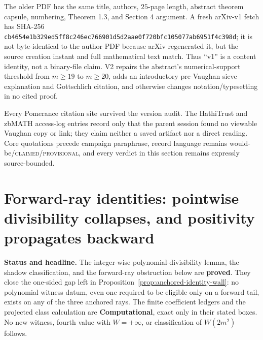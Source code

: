 \documentclass[10pt,reqno]{amsart}
\theoremstyle{definition}
\newcommand{\1}{\mathbf 1}
\begin{document}
The older PDF has the same title, authors, $25$-page length, abstract theorem
capsule, numbering, Theorem 1.3, and Section 4 argument.  A fresh arXiv-v1
fetch has SHA-256
\texttt{cb4654e1b329ed5ff8c246ec766901d5d2aae0f720bfc105077ab6951f4c398d};
it is not byte-identical to the author PDF because arXiv regenerated it,
but the source creation instant and full mathematical text match.  Thus
``v1'' is a content identity, not a binary-file claim.  V2 repairs the
abstract's numerical-support threshold from $m\geq19$ to $m\geq20$, adds an
introductory pre-Vaughan sieve explanation and Gottschlich citation, and
otherwise changes notation/typesetting in no cited proof.

Every Pomerance citation site survived the version audit.  The HathiTrust
and zbMATH access-log entries record only that the parent session found no
viewable Vaughan copy or link; they claim neither a saved artifact nor a
direct reading.  Core quotations precede campaign paraphrase, record
language remains would-be/\textsc{claimed/provisional}, and every verdict in
this section remains expressly source-bounded.

\section{Forward-ray identities: pointwise divisibility collapses, and positivity propagates backward}
\label{sec:forward-ray}
\medskip\noindent\textbf{Status and headline.}
The integer-wise polynomial-divisibility lemma, the shadow classification,
and the forward-ray obstruction below are \textbf{proved}.  They close the
one-sided gap left in Proposition~\ref{prop:anchored-identity-wall}: no
polynomial witness datum, even one required to be eligible only on a forward
tail, exists on any of the three anchored rays.  The finite coefficient
ledgers and the projected class calculation are \textbf{Computational}, exact
only in their stated boxes.  No new witness, fourth value with
$W=+\infty$, or classification of $W(2m^2)$ follows.
\end{document}
